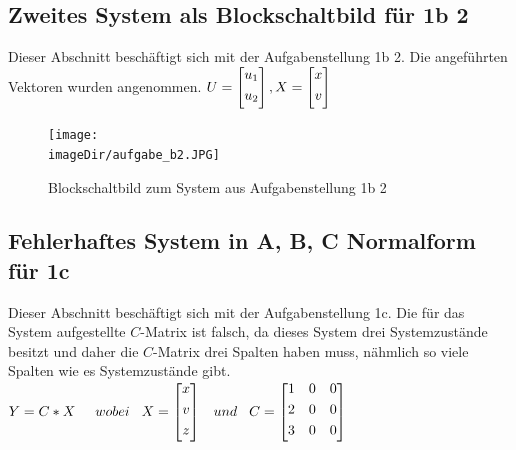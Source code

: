 \documentclass[11pt, a4paper, twoside]{article}   	%
\newcommand{\imageDir}{./images/}
\begin{document}
\subsection{Zweites System als Blockschaltbild für 1b 2}
Dieser Abschnitt beschäftigt sich mit der Aufgabenstellung 1b 2. Die angeführten Vektoren wurden angenommen.
\newline
$
U= \begin{bmatrix}
	u_1 \\[0.3em]
	u_2 \\[0.3em]
\end{bmatrix}
,
X = \begin{bmatrix}
	x \\[0.3em]
	v \\[0.3em]
\end{bmatrix}
\newline
\newline
\newline
$
\begin{figure}[h]
\centering
\texttt{[image: \\imageDir/aufgabe\_b2.JPG]}
\caption{Blockschaltbild zum System aus Aufgabenstellung 1b 2}
\label{fig:exercise-b1}
\end{figure}
\newpage

\subsection{Fehlerhaftes System in A, B, C Normalform für 1c}
Dieser Abschnitt beschäftigt sich mit der Aufgabenstellung 1c. Die für das System aufgestellte $C$-Matrix ist falsch, da dieses System drei Systemzustände besitzt und daher die $C$-Matrix drei Spalten haben muss, nähmlich so viele Spalten wie es Systemzustände gibt.
\newline
\newline
$
Y=C*X \hspace{5mm} wobei \hspace{3mm} 
X= \begin{bmatrix}
	x \\[0.3em]
	v \\[0.3em]
	z \\[0.3em]
\end{bmatrix}
\hspace{3mm} und \hspace{3mm} 
C = \begin{bmatrix}
	1 & 0 & 0 \\[0.3em]
	2 & 0 & 0 \\[0.3em]
	3 & 0 & 0 \\[0.3em]
\end{bmatrix}
$
\end{document}
